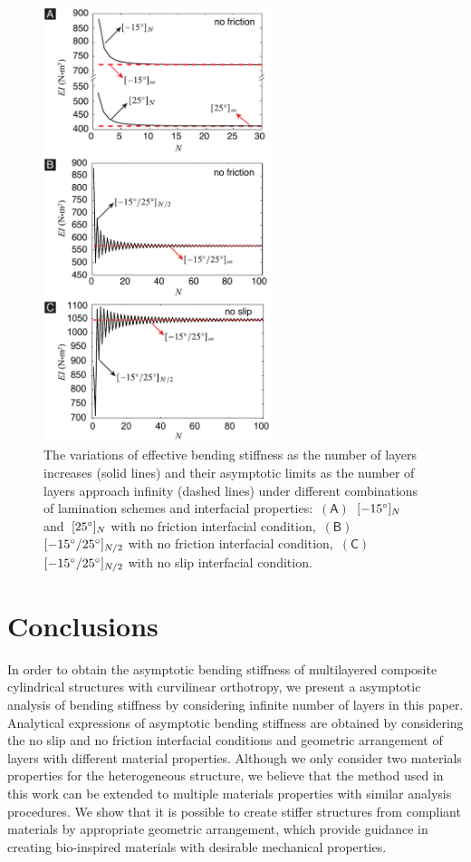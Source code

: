 \documentclass[preprint,10pt,times]{elsarticle}
\numberwithin{equation}{section}
\newcommand{\pr}[1]{\left( #1 \right)}
\newcommand{\subf}[1]{\pr{\textsf{#1}}}
\renewcommand{\>}{$\Rightarrow$}
\begin{document}
\begin{figure}[h!]
	\centering
	\graphicspath{{../LyxFiles/figure/}}
	\includegraphics[width=0.6\textwidth]{combined_EI.pdf}
	\caption{The variations of effective bending stiffness as the number of layers increases (solid lines) and their asymptotic limits as the number of layers approach infinity (dashed lines) under different combinations of lamination schemes and interfacial properties:~$\subf{A}$~$[-15 \degree]_N$ and~$[25 \degree]_N$ with no friction interfacial condition,~$\subf{B}$~$[-15 \degree/ 25 \degree]_{N/2}$ with no friction interfacial condition,~$\subf{C}$~$[-15 \degree/25 \degree]_{N/2}$ with no slip interfacial condition.}
	\label{fig:asymptotic_EI}
\end{figure}

\section{Conclusions}
\label{sec:conclusion}
In order to obtain the asymptotic bending stiffness of multilayered composite cylindrical structures with curvilinear orthotropy, we present a asymptotic analysis of bending stiffness by considering infinite number of layers in this paper.
Analytical expressions of asymptotic bending stiffness are obtained by considering the no slip and no friction interfacial conditions and geometric arrangement of layers with different material properties.
Although we only consider two materials properties for the heterogeneous structure, we believe that the method used in this work can be extended to multiple materials properties with similar analysis procedures.
We show that it is possible to create stiffer structures from compliant materials by appropriate geometric arrangement, which provide guidance in creating bio-inspired materials with desirable mechanical properties.
\end{document}
